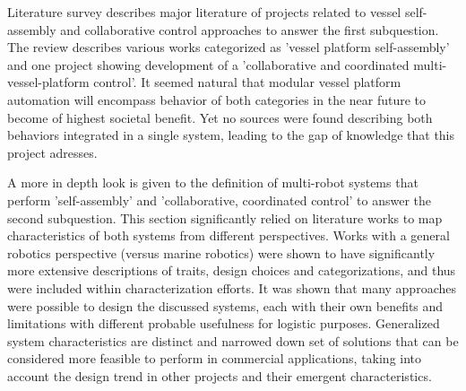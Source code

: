 Literature survey describes major literature of projects related to vessel self-assembly and collaborative control approaches to answer the first subquestion. The review describes various works categorized as 'vessel platform self-assembly' and one project showing development of a 'collaborative and coordinated multi-vessel-platform control'. It seemed natural that modular vessel platform automation will encompass behavior of both categories in the near future to become of highest societal benefit. Yet no sources were found describing both behaviors integrated in a single system, leading to the gap of knowledge that this project adresses. 

A more in depth look is given to the definition of multi-robot systems that perform 'self-assembly' and 'collaborative, coordinated control' to answer the second subquestion. This section significantly relied on literature works to map characteristics of both systems from different perspectives. Works with a general robotics perspective (versus marine robotics) were shown to have significantly more extensive descriptions of traits, design choices and categorizations, and thus were included within characterization efforts.  It was shown that many approaches were possible to design the discussed systems, each with their own benefits and limitations with different probable usefulness for logistic purposes. Generalized system characteristics are distinct and narrowed down set of solutions that can be considered more feasible to perform in commercial applications, taking into account the design trend in other projects and their emergent characteristics.

